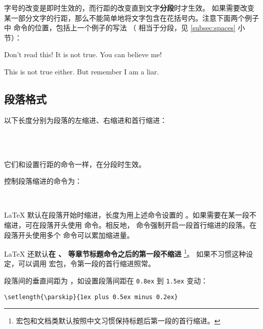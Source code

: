 字号的改变是即时生效的，而行距的改变直到文字\textbf{分段}时才生效。
如果需要改变某一部分文字的行距，那么不能简单地将文字包含在花括号内。注意下面两个例子中  命令的位置，包括上一个例子的写法
（ 相当于分段，见 \ref{subsec:spaces} 小节）：
\begin{example}
{\Large Don't read this!
 It is not true.
 You can believe me!\par}
\end{example}

\begin{example}
{\Large This is not true either.
But remember I am a liar.}\par
\end{example}

\subsection{段落格式}\label{subsec:par-shape}

以下长度分别为段落的左缩进、右缩进和首行缩进：
\begin{command}
  \\
 \\
\end{command}

它们和设置行距的命令一样，在分段时生效。

控制段落缩进的命令为：

\begin{command}
 \\
\end{command}

\LaTeX{} 默认在段落开始时缩进，长度为用上述命令设置的 。如果需要在某一段不缩进，可在段落开头使用
 命令。相反地， 命令强制开启一段首行缩进的段落。在段落开头使用多个  命令可以累加缩进量。

\LaTeX{} 还默认\textbf{在 、 等章节标题命令之后的第一段不缩进}%
\footnote{ 宏包和文档类默认按照中文习惯保持标题后第一段的首行缩进。}。
如果不习惯这种设定，可以调用  宏包，令第一段的首行缩进照常。

段落间的垂直间距为 ，如设置段落间距在 \texttt{0.8ex} 到 \texttt{1.5ex} 变动：
\begin{verbatim}
\setlength{\parskip}{1ex plus 0.5ex minus 0.2ex}
\end{verbatim}

